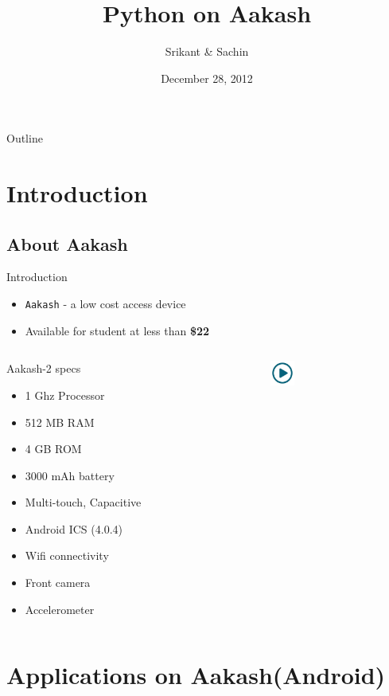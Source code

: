 \documentclass{beamer}
\title[Python on Aakash]{Python on Aakash}
\author{Srikant \& Sachin}
\institute{Indian Institute of Technology, Bombay}
\date{December 28, 2012}
\begin{document}
\begin{frame}
  \titlepage
\end{frame}
\begin{frame}{Outline}
 \tableofcontents
\end{frame}
\section{Introduction}
\subsection{About Aakash}
\begin{frame}{Introduction}
\begin{itemize}
  \item {\tt Aakash} - a low cost access device
  \item Available for student at less than {\bf \$22}
\end{itemize}
\begin{columns}
\begin{column}{.48\textwidth}
\begin{block}{Aakash-2 specs}
\begin{itemize}
  \item 1 Ghz Processor
  \item 512 MB RAM
  \item 4 GB ROM
  \item 3000 mAh battery
  \item Multi-touch, Capacitive
  \item Android ICS (4.0.4) 
  \item Wifi connectivity
  \item Front camera
  \item Accelerometer
\end{itemize}
\end{block}
\end{column}%
\begin{column}{.20\textwidth}
  \centerline{\href{file:///home/sachin/github/slides/scipy2012/android_app.3gp}{\includegraphics[height=0.8cm,width=0.8cm]{play.jpg}}}
\end{column}%
\end{columns}
\end{frame}
\section{Applications on Aakash(Android)}
\end{document}
